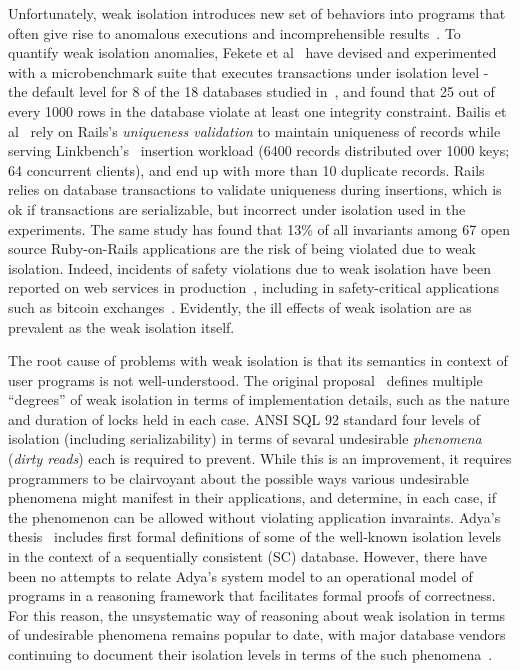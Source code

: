 Unfortunately, weak isolation introduces new set of behaviors into
programs that often give rise to anomalous executions and
incomprehensible results~\cite{pldi15}. To quantify weak isolation
anomalies, Fekete et al~\cite{feketevldb09} have devised and
experimented with a microbenchmark suite that executes transactions
under  isolation level - the default level for 8
of the 18 databases studied in~\cite{bailishotos}, and found that 25
out of every 1000 rows in the database violate at least one integrity
constraint. Bailis et al~\cite{bailisferal} rely on Rails's
\emph{uniqueness validation} to maintain uniqueness of records while
serving Linkbench's~\cite{linkbench} insertion workload (6400 records
distributed over 1000 keys; 64 concurrent clients), and end up with
more than 10 duplicate records. Rails relies on database transactions
to validate uniqueness during insertions, which is ok if transactions
are serializable, but incorrect under  isolation
used in the experiments. The same study has found that 13\% of all
invariants among 67 open source Ruby-on-Rails applications are the
risk of being violated due to weak isolation. Indeed, incidents of
safety violations due to weak isolation have been reported on web
services in production~\cite{starbucksbug, scimedbug}, including in
safety-critical applications such as bitcoin
exchanges~\cite{poloniexbug, bitcoinbug}. Evidently, the ill effects
of weak isolation are as prevalent as the weak isolation itself.

The root cause of problems with weak isolation is that its semantics
in context of user programs is not well-understood. The original
proposal~\cite{gray1976} defines multiple ``degrees'' of weak
isolation in terms of implementation details, such as the nature and
duration of locks held in each case. ANSI SQL 92 standard four levels
of isolation (including serializability) in terms of sevaral
undesirable \emph{phenomena} (\eg \emph{dirty reads}) each is required
to prevent. While this is an improvement, it requires programmers to
be clairvoyant about the possible ways various undesirable phenomena
might manifest in their applications, and determine, in each case, if
the phenomenon can be allowed without violating application
invaraints. Adya's thesis~\cite{adyaphd} includes first formal
definitions of some of the well-known isolation levels in the context
of a sequentially consistent (SC) database. However, there have been
no attempts to relate Adya's system model to an operational model of
programs in a reasoning framework that facilitates formal proofs of
correctness. For this reason, the unsystematic way of reasoning about
weak isolation in terms of undesirable phenomena remains popular to
date, with major database vendors continuing to document their
isolation levels in terms of the such phenomena~\cite{postgresiso,
mysqliso, oracleiso}.

